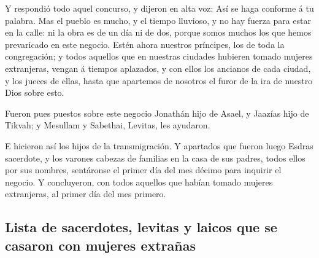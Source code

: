  Y respondió todo aquel concurso, y dijeron en alta voz:
Así se haga conforme á tu palabra.  Mas el pueblo es
mucho, y el tiempo lluvioso, y no hay fuerza para estar en la calle: ni
la obra es de un día ni de dos, porque somos muchos los que hemos
prevaricado en este negocio.  Estén ahora nuestros
príncipes, los de toda la congregación; y todos aquellos que en nuestras
ciudades hubieren tomado mujeres extranjeras, vengan á tiempos
aplazados, y con ellos los ancianos de cada ciudad, y los jueces de
ellas, hasta que apartemos de nosotros el furor de la ira de nuestro
Dios sobre esto.

 Fueron pues puestos sobre este negocio Jonathán hijo de
Asael, y Jaazías hijo de Tikvah; y Mesullam y Sabethai, Levitas, les
ayudaron.

 E hicieron así los hijos de la transmigración. Y
apartados que fueron luego Esdras sacerdote, y los varones cabezas de
familias en la casa de sus padres, todos ellos por sus nombres,
sentáronse el primer día del mes décimo para inquirir el negocio.
 Y concluyeron, con todos aquellos que habían tomado
mujeres extranjeras, al primer día del mes primero.

\hypertarget{lista-de-sacerdotes-levitas-y-laicos-que-se-casaron-con-mujeres-extrauxf1as}{%
\subsection{Lista de sacerdotes, levitas y laicos que se casaron con
mujeres
extrañas}\label{lista-de-sacerdotes-levitas-y-laicos-que-se-casaron-con-mujeres-extrauxf1as}}

